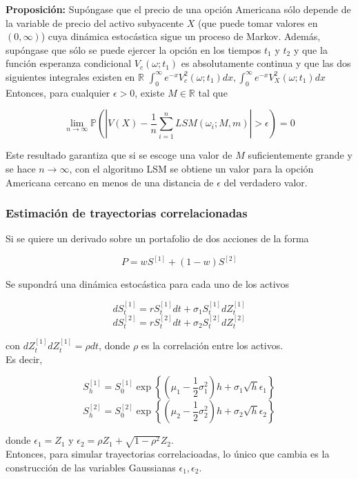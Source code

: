 \documentclass[11pt]{article}
\begin{document}
\textbf{Proposición:} 
Supóngase que el precio de una opción Americana
sólo depende de la variable de precio del activo subyacente $X$ (que puede tomar valores en $(0,\infty)$) cuya dinámica estocástica sigue un proceso de Markov. Además, supóngase que sólo se puede ejercer la opción en los tiempos $t_1$ y $t_2$ y que la función esperanza condicional $V_c(\omega;t_1)$ es absolutamente continua y que las dos
siguientes integrales existen en $\mathbb{R}$
$\int_0^{\infty}e^{-x}V^2_c(\omega;t_1)dx, \int_0^{\infty}e^{-x}V^2_X(\omega;t_1)dx$
Entonces, para cualquier $\epsilon>0$, existe $M\in\mathbb{R}$ tal que

$$\lim_{n\rightarrow \infty} \mathbb{P}\left(\left|V(X)-\frac{1}{n}\sum_{i=1}^n LSM(\omega_i;M,m)\right|>\epsilon\right)=0$$

Este resultado garantiza que si se escoge una valor de $M$ suficientemente grande y se hace $n\rightarrow \infty$, con el algoritmo LSM se obtiene un valor para la opción Americana cercano en menos de una distancia de $\epsilon$ del verdadero valor.

\subsubsection{Estimación de trayectorias correlacionadas}

Si se quiere un derivado sobre un portafolio de dos acciones de la forma

$$P = wS^{[1]} + (1-w)S^{[2]}$$

Se supondrá una dinámica estocástica para cada uno de los activos

$$dS_t^{[1]} = rS_t^{[1]}dt + \sigma_1S_t^{[1]}dZ_t^{[1]}$$
$$dS_t^{[2]} = rS_t^{[2]}dt + \sigma_2S_t^{[2]}dZ_t^{[2]}$$

con $dZ_t^{[1]}dZ_t^{[1]} = \rho dt$, donde $\rho$ es la correlación entre los activos.\\

Es decir,

$$S_h^{[1]} = S_0^{[1]}\exp\left\{(\mu_1 - \frac{1}{2}\sigma_1^2)h + \sigma_1\sqrt{h}\epsilon_1\right\} $$
$$S_h^{[2]} = S_0^{[2]}\exp\left\{(\mu_2 - \frac{1}{2}\sigma_2^2)h + \sigma_2\sqrt{h}\epsilon_2\right\} $$

donde $\epsilon_1 = Z_1$ y $\epsilon_2 =\rho Z_1 + \sqrt{1-\rho^2}Z_2$.\\

Entonces, para simular trayectorias correlacioadas, lo único que cambia es la construcción de las variables Gaussianas $\epsilon_1,\epsilon_2$.\\
\end{document}

